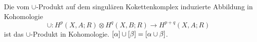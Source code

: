 \begin{definition}
	Die vom $\cup$-Produkt auf dem singulären Kokettenkomplex induzierte Abbildung in Kohomologie 
	\[
		\cup \colon H^p(X,A;R) \otimes H^q(X,B;R) \longrightarrow H^{p+q}(X,A;R)
	\]
	ist das $\cup$-Produkt in Kohomologie. $\benbrace*{\alpha} \cup \benbrace*{\beta} = \benbrace*{\alpha \cup \beta}$.
\end{definition}











\cleardoubleoddemptypage
{}
\setcounter{page}{1}

\printindex
\listoffigures
\todototoc
{}

